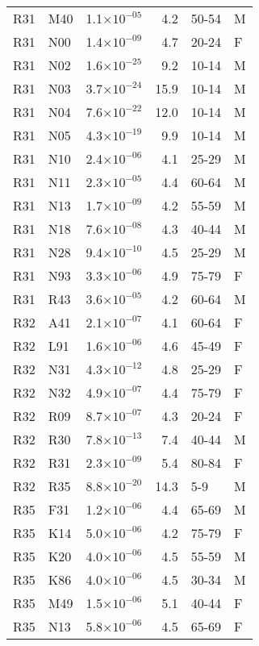 \begin{longtable}{lllrll}
   R31 & M40 & 1.1$\times10^{-05}$ & 4.2 & 50-54 & M \\ 
   R31 & N00 & 1.4$\times10^{-09}$ & 4.7 & 20-24 & F \\ 
   R31 & N02 & 1.6$\times10^{-25}$ & 9.2 & 10-14 & M \\ 
   R31 & N03 & 3.7$\times10^{-24}$ & 15.9 & 10-14 & M \\ 
   R31 & N04 & 7.6$\times10^{-22}$ & 12.0 & 10-14 & M \\ 
   R31 & N05 & 4.3$\times10^{-19}$ & 9.9 & 10-14 & M \\ 
   R31 & N10 & 2.4$\times10^{-06}$ & 4.1 & 25-29 & M \\ 
   R31 & N11 & 2.3$\times10^{-05}$ & 4.4 & 60-64 & M \\ 
   R31 & N13 & 1.7$\times10^{-09}$ & 4.2 & 55-59 & M \\ 
   R31 & N18 & 7.6$\times10^{-08}$ & 4.3 & 40-44 & M \\ 
   R31 & N28 & 9.4$\times10^{-10}$ & 4.5 & 25-29 & M \\ 
   R31 & N93 & 3.3$\times10^{-06}$ & 4.9 & 75-79 & F \\ 
   R31 & R43 & 3.6$\times10^{-05}$ & 4.2 & 60-64 & M \\ 
   R32 & A41 & 2.1$\times10^{-07}$ & 4.1 & 60-64 & F \\ 
   R32 & L91 & 1.6$\times10^{-06}$ & 4.6 & 45-49 & F \\ 
   R32 & N31 & 4.3$\times10^{-12}$ & 4.8 & 25-29 & F \\ 
   R32 & N32 & 4.9$\times10^{-07}$ & 4.4 & 75-79 & F \\ 
   R32 & R09 & 8.7$\times10^{-07}$ & 4.3 & 20-24 & F \\ 
   R32 & R30 & 7.8$\times10^{-13}$ & 7.4 & 40-44 & M \\ 
   R32 & R31 & 2.3$\times10^{-09}$ & 5.4 & 80-84 & F \\ 
   R32 & R35 & 8.8$\times10^{-20}$ & 14.3 & 5-9 & M \\ 
   R35 & F31 & 1.2$\times10^{-06}$ & 4.4 & 65-69 & M \\ 
   R35 & K14 & 5.0$\times10^{-06}$ & 4.2 & 75-79 & F \\ 
   R35 & K20 & 4.0$\times10^{-06}$ & 4.5 & 55-59 & M \\ 
   R35 & K86 & 4.0$\times10^{-06}$ & 4.5 & 30-34 & M \\ 
   R35 & M49 & 1.5$\times10^{-06}$ & 5.1 & 40-44 & F \\ 
   R35 & N13 & 5.8$\times10^{-06}$ & 4.5 & 65-69 & F \\ 

\end{longtable}
